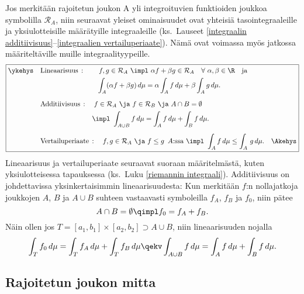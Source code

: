 Jos merkitään rajoitetun joukon A yli integroituvien funktioiden joukkoa symbolilla
$\mathcal{R}_A$, niin seuraavat yleiset ominaisuudet ovat yhteisiä tasointegraaleille ja 
yksiulotteisille määrätyille integraaleille (ks.\ Lauseet
\ref{integraalin additiivisuus}--\ref{integraalien vertailuperiaate}). Nämä ovat voimassa myös
jatkossa määriteltäville muille integraalityypeille.
%
\[ 
\boxed{ \begin{aligned}
\ykehys\quad &\text{Lineaarisuus}\,: \qquad 
f,g \in \mathcal{R}_A\ \impl\ \alpha f + \beta g \in \mathcal{R}_A \quad
                                         \forall\ \alpha,\beta \in \R \quad \text{ja} \\
&\phantom{\text{Lineaarisuus}\,:} \qquad 
\int_A (\alpha f + \beta g)\,d\mu = \alpha\int_A f\,d\mu + \beta\int_A g\,d\mu. \\[2mm]
&\text{Additiivisuus}\,: \quad 
f\in\mathcal{R}_A\ \ja\ f\in\mathcal{R}_B\ \ja\ A \cap B = \emptyset \\
&\phantom{\text{Additiivisuus}\,:} \quad \impl\ \int_{A \cup B} f\,d\mu 
                                              = \int_A f\,d\mu + \int_B f\,d\mu. \\[2mm]
&\text{Vertailuperiaate}\,: \quad 
f,g \in \mathcal{R}_A\ \ja\ f \le g\,\ A\text{:ssa}\ \impl\ \int_A f\,d\mu \le \int_A\,g\,d\mu. 
        \quad\Akehys \end{aligned} } 
\]
Lineaarisuus ja vertailuperiaate seuraavat suoraan määritelmästä, kuten yksi\-ulotteisessa
tapauksessa (ks.\ Luku \ref{riemannin integraali}). Additiivisuus on johdettavissa
yksinkertaisimmin lineaarisuudesta: Kun merkitään $f$:n nollajatkoja joukkojen $A$, $B$ ja
$A \cup B$ suhteen vastaavasti symboleilla $f_A$, $f_B$ ja $f_0$, niin pätee
\[
A \cap B = \emptyset \qimpl f_0=f_A+f_B.
\]
Näin ollen jos $T=[a_1,b_1]\times[a_2,b_2] \supset A \cup B$, niin lineaarisuuden nojalla
\[
\int_T f_0\,d\mu = \int_T f_A\,d\mu + \int_T f_B\,d\mu
   \qekv \int_{A \cup B} f\,d\mu = \int_A f\,d\mu + \int_B f\,d\mu.
\]

\subsection*{Rajoitetun joukon mitta}

